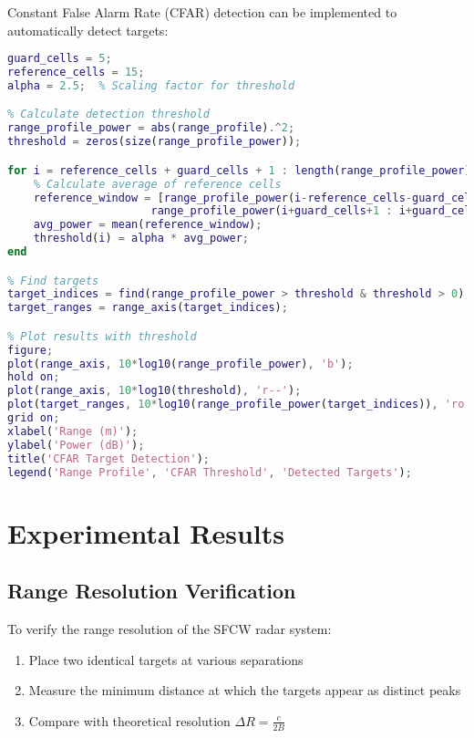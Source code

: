 \documentclass[12pt,a4paper]{article}
\begin{document}
Constant False Alarm Rate (CFAR) detection can be implemented to automatically detect targets:

\begin{lstlisting}[language=Matlab, caption=CFAR target detection]
% Parameters
guard_cells = 5;
reference_cells = 15;
alpha = 2.5;  % Scaling factor for threshold

% Calculate detection threshold
range_profile_power = abs(range_profile).^2;
threshold = zeros(size(range_profile_power));

for i = reference_cells + guard_cells + 1 : length(range_profile_power) - reference_cells - guard_cells
    % Calculate average of reference cells
    reference_window = [range_profile_power(i-reference_cells-guard_cells : i-guard_cells-1); 
                      range_profile_power(i+guard_cells+1 : i+guard_cells+reference_cells)];
    avg_power = mean(reference_window);
    threshold(i) = alpha * avg_power;
end

% Find targets
target_indices = find(range_profile_power > threshold & threshold > 0);
target_ranges = range_axis(target_indices);

% Plot results with threshold
figure;
plot(range_axis, 10*log10(range_profile_power), 'b');
hold on;
plot(range_axis, 10*log10(threshold), 'r--');
plot(target_ranges, 10*log10(range_profile_power(target_indices)), 'ro');
grid on;
xlabel('Range (m)');
ylabel('Power (dB)');
title('CFAR Target Detection');
legend('Range Profile', 'CFAR Threshold', 'Detected Targets');
\end{lstlisting}

\section{Experimental Results}

\subsection{Range Resolution Verification}

To verify the range resolution of the SFCW radar system:

\begin{enumerate}
    \item Place two identical targets at various separations
    \item Measure the minimum distance at which the targets appear as distinct peaks
    \item Compare with theoretical resolution $\Delta R = \frac{c}{2B}$
\end{enumerate}
\end{document}
